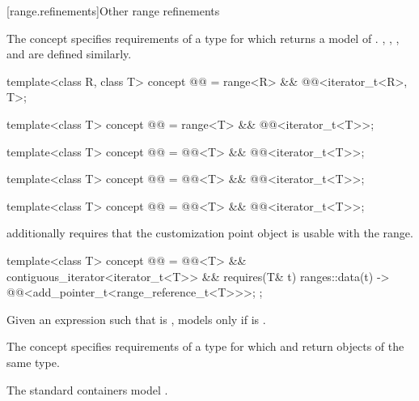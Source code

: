 [range.refinements]{Other range refinements}

\pnum
The  concept specifies requirements of a
 type for which  returns
a model of .
, , ,
and  are defined similarly.

\begin{itemdecl}
template<class R, class T>
  concept @@ =
    range<R> && @@<iterator_t<R>, T>;

template<class T>
  concept @@ =
    range<T> && @@<iterator_t<T>>;

template<class T>
  concept @@ =
    @@<T> && @@<iterator_t<T>>;

template<class T>
  concept @@ =
    @@<T> && @@<iterator_t<T>>;

template<class T>
  concept @@ =
    @@<T> && @@<iterator_t<T>>;
\end{itemdecl}

\pnum
{} additionally requires that
the  customization point object
is usable with the range.

\begin{itemdecl}
template<class T>
  concept @@ =
    @@<T> && contiguous_iterator<iterator_t<T>> &&
    requires(T& t) {
      { ranges::data(t) } -> @@<add_pointer_t<range_reference_t<T>>>;
    };
\end{itemdecl}

\pnum
Given an expression  such that  is ,
 models  only if
is .

\pnum
The  concept specifies requirements of
a  type for which  and
 return objects of the same type.
\begin{example}
The standard containers model .
\end{example}

